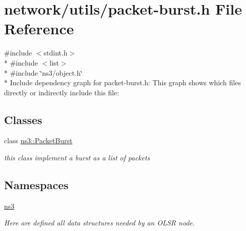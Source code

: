 \hypertarget{packet-burst_8h}{}\section{network/utils/packet-\/burst.h File Reference}
\label{packet-burst_8h}
{\ttfamily \#include $<$stdint.\+h$>$}\\*
{\ttfamily \#include $<$list$>$}\\*
{\ttfamily \#include \char`\"{}ns3/object.\+h\char`\"{}}\\*
Include dependency graph for packet-\/burst.h\+:
This graph shows which files directly or indirectly include this file\+:
\subsection*{Classes}
\begin{DoxyCompactItemize}
\item 
class \hyperlink{classns3_1_1PacketBurst}{ns3\+::\+Packet\+Burst}
\begin{DoxyCompactList}\small\item\em this class implement a burst as a list of packets \end{DoxyCompactList}\end{DoxyCompactItemize}
\subsection*{Namespaces}
\begin{DoxyCompactItemize}
\item 
 \hyperlink{namespacens3}{ns3}
\begin{DoxyCompactList}\small\item\em Here are defined all data structures needed by an O\+L\+SR node. \end{DoxyCompactList}\end{DoxyCompactItemize}
